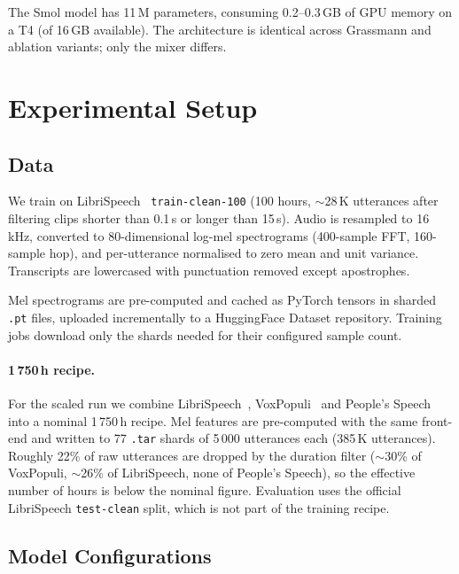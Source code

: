 \documentclass[11pt,a4paper]{article}
\begin{document}
The Smol model has 11\,M parameters, consuming 0.2--0.3\,GB of GPU
memory on a T4 (of 16\,GB available).  The architecture is identical
across Grassmann and ablation variants; only the mixer differs.

\section{Experimental Setup}
\label{sec:experiments}

\subsection{Data}

We train on LibriSpeech~\citep{panayotov2015librispeech}
\texttt{train-clean-100} (100 hours, $\sim$28\,K utterances after
filtering clips shorter than 0.1\,s or longer than 15\,s).  Audio is
resampled to 16\,kHz, converted to 80-dimensional log-mel spectrograms
(400-sample FFT, 160-sample hop), and per-utterance normalised to zero
mean and unit variance.  Transcripts are lowercased with punctuation
removed except apostrophes.

Mel spectrograms are pre-computed and cached as PyTorch tensors in
sharded \texttt{.pt} files, uploaded incrementally to a HuggingFace
Dataset repository.  Training jobs download only the shards needed for
their configured sample count.

\paragraph{1\,750\,h recipe.}  For the scaled run we combine
LibriSpeech~\citep{panayotov2015librispeech},
VoxPopuli~\citep{wang2021voxpopuli} and People's
Speech~\citep{galvez2021peoples} into a nominal 1\,750\,h recipe.  Mel
features are pre-computed with the same front-end and written to 77
\texttt{.tar} shards of 5\,000 utterances each (385\,K utterances).
Roughly 22\% of raw utterances are dropped by the duration filter
($\sim$30\% of VoxPopuli, $\sim$26\% of LibriSpeech, none of People's
Speech), so the effective number of hours is below the nominal figure.
Evaluation uses the official LibriSpeech \texttt{test-clean} split,
which is not part of the training recipe.

\subsection{Model Configurations}
\end{document}
